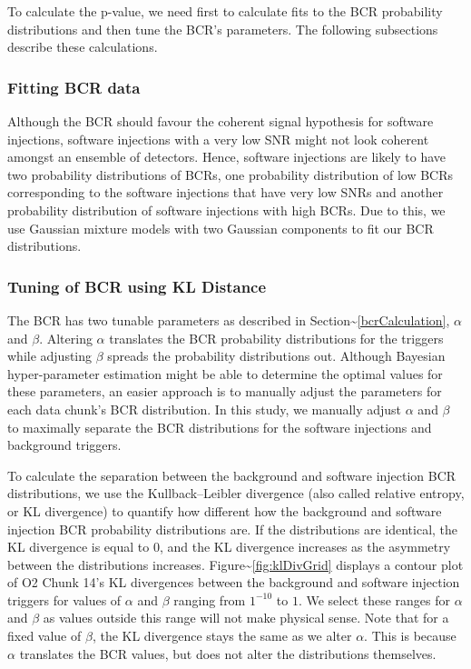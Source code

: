 \documentclass[%
 reprint,
 amsmath,amssymb,
 aps,
]{revtex4-2}
\begin{document}
To calculate the p-value, we need first to calculate fits to the BCR probability
distributions and then tune the BCR's parameters. The following subsections describe these calculations.

\hypertarget{fitting-bcr-data}{%
\subsubsection{Fitting BCR data}\label{fitting-bcr-data}}

Although the BCR should favour the coherent signal hypothesis for software injections,
software injections with a very low SNR might not look coherent amongst an ensemble of
detectors. Hence, software injections are likely to have two probability distributions
of BCRs, one probability distribution of low BCRs corresponding to the software
injections that have very low SNRs and another probability distribution of software
injections with high BCRs. Due to this, we use Gaussian mixture models with two Gaussian
components to fit our BCR distributions.

\hypertarget{tuning-of-bcr-using-kl-distance}{%
\subsubsection{Tuning of BCR using KL Distance}\label{tuning-of-bcr-using-kl-distance}}

The BCR has two tunable parameters as described in Section\textasciitilde\ref{bcrCalculation},
\(\alpha\) and \(\beta\). Altering \(\alpha\) translates the BCR probability distributions for
the triggers while adjusting \(\beta\) spreads the probability distributions out. Although
Bayesian hyper-parameter estimation might be able to determine the optimal values for
these parameters, an easier approach is to manually adjust the parameters for each data
chunk's BCR distribution. In this study, we manually adjust \(\alpha\) and \(\beta\) to
maximally separate the BCR distributions for the software injections and background
triggers.

To calculate the separation between the background and software injection BCR
distributions, we use the Kullback--Leibler divergence (also called relative entropy, or
KL divergence) to quantify how different how the background and software injection BCR
probability distributions are. If the distributions are identical, the KL divergence is
equal to 0, and the KL divergence increases as the asymmetry between the distributions
increases. Figure\textasciitilde\ref{fig:klDivGrid} displays a contour plot of O2 Chunk 14's KL
divergences between the background and software injection triggers for values of
\(\alpha\) and \(\beta\) ranging from \(1^{-10}\) to \(1\). We select these ranges for \(\alpha\)
and \(\beta\) as values outside this range will not make physical sense. Note that for a
fixed value of \(\beta\), the KL divergence stays the same as we alter \(\alpha\). This is
because \(\alpha\) translates the BCR values, but does not alter the distributions
themselves.
\end{document}
